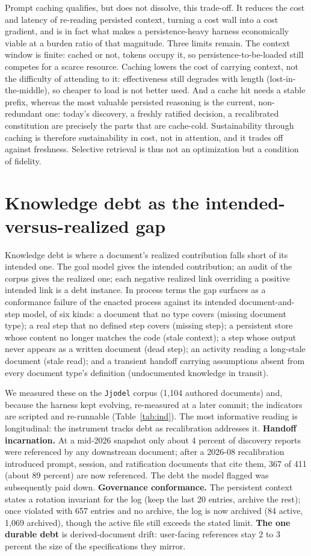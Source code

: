 \documentclass[sigconf]{acmart}
\begin{document}
Prompt caching qualifies, but does not dissolve, this trade-off. It reduces the cost and latency of re-reading persisted context, turning a cost wall into a cost gradient, and is in fact what makes a persistence-heavy harness economically viable at a burden ratio of that magnitude. Three limits remain. The context window is finite: cached or not, tokens occupy it, so persistence-to-be-loaded still competes for a scarce resource. Caching lowers the cost of carrying context, not the difficulty of attending to it: effectiveness still degrades with length (lost-in-the-middle), so cheaper to load is not better used. And a cache hit needs a stable prefix, whereas the most valuable persisted reasoning is the current, non-redundant one: today's discovery, a freshly ratified decision, a recalibrated constitution are precisely the parts that are cache-cold. Sustainability through caching is therefore sustainability in cost, not in attention, and it trades off against freshness. Selective retrieval is thus not an optimization but a condition of fidelity.

\section{Knowledge debt as the intended-versus-realized gap}
Knowledge debt is where a document's realized contribution falls short of its intended one. The goal model gives the intended contribution; an audit of the corpus gives the realized one; each negative realized link overriding a positive intended link is a debt instance. In process terms the gap surfaces as a conformance failure of the enacted process against its intended document-and-step model, of six kinds: a document that no type covers (missing document type); a real step that no defined step covers (missing step); a persistent store whose content no longer matches the code (stale context); a step whose output never appears as a written document (dead step); an activity reading a long-stale document (stale read); and a transient handoff carrying assumptions absent from every document type's definition (undocumented knowledge in transit).

We measured these on the \texttt{Jjodel} corpus (1{,}104 authored documents) and, because the harness kept evolving, re-measured at a later commit; the indicators are scripted and re-runnable (Table~\ref{tab:ind}). The most informative reading is longitudinal: the instrument tracks debt as recalibration addresses it. \textbf{Handoff incarnation.} At a mid-2026 snapshot only about 4 percent of discovery reports were referenced by any downstream document; after a 2026-08 recalibration introduced prompt, session, and ratification documents that cite them, 367 of 411 (about 89 percent) are now referenced. The debt the model flagged was subsequently paid down. \textbf{Governance conformance.} The persistent context states a rotation invariant for the log (keep the last 20 entries, archive the rest); once violated with 657 entries and no archive, the log is now archived (84 active, 1{,}069 archived), though the active file still exceeds the stated limit. \textbf{The one durable debt} is derived-document drift: user-facing references stay 2 to 3 percent the size of the specifications they mirror.
\end{document}
